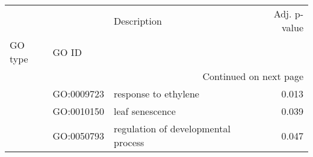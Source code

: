 \begin{longtable}{lllr}
\toprule
   &            &                          Description &  Adj. p-value \\
GO type & GO ID &                                      &               \\
\midrule
\endhead
\midrule
\multicolumn{4}{r}{{Continued on next page}} \\
\midrule
\endfoot

\bottomrule
\endlastfoot
\multirow{3}{*}{BP} & GO:0009723 &                 response to ethylene &         0.013 \\
   & GO:0010150 &                      leaf senescence &         0.039 \\
   & GO:0050793 &  regulation of developmental process &         0.047 \\
\end{longtable}
